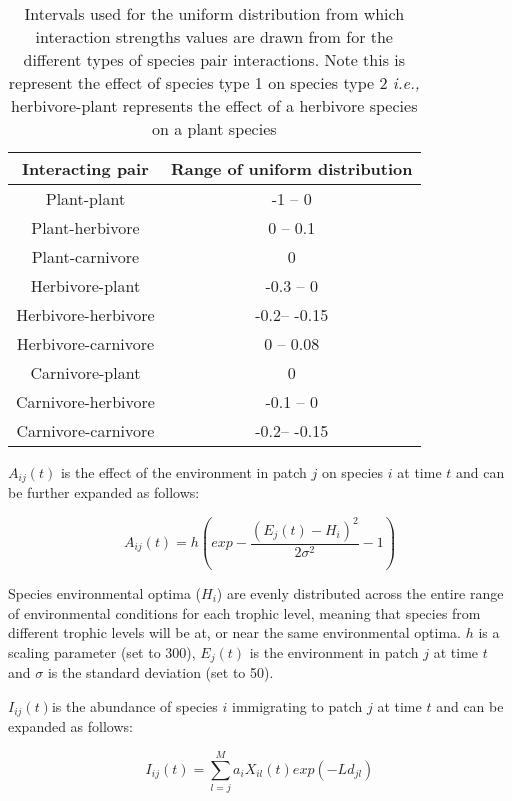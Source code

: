 \begin{table}[h!]
\centering
\begin{tabular}{||c c||} 
 \hline
Interacting pair & Range of uniform distribution \\ [0.5ex] \hline\hline
 Plant-plant & -1 -- 0 \\ 
 Plant-herbivore & 0 -- 0.1 \\
 Plant-carnivore & 0 \\
 Herbivore-plant & -0.3 -- 0 \\
 Herbivore-herbivore & -0.2-- -0.15 \\
 Herbivore-carnivore & 0 -- 0.08 \\
 Carnivore-plant & 0  \\
 Carnivore-herbivore & -0.1 -- 0  \\
 Carnivore-carnivore & -0.2-- -0.15 \\ [1ex] 
 \hline
\end{tabular}
\caption{Intervals used for the uniform distribution from which interaction
strengths values are drawn from for the different types of species pair
interactions. Note this is represent the effect of species type 1 on species
type 2 \emph{i.e.,} herbivore-plant represents the effect of a herbivore species
on a plant species}
\label{table:interaction_strength}
\end{table}

$A_{ij}(t)$ is the effect of the environment in patch $j$ on species $i$ at time $t$ and can be further expanded as follows:  

\begin{equation} \label{eq:metacomm_env}
A_{ij}(t)=h\left(exp-\frac{(E_{j}(t)-H_{i})^2}{2\sigma^2}-1\right)
\end{equation}

Species environmental optima ($H_i$) are evenly distributed across the entire
range of environmental conditions for each trophic level, meaning that species
from different trophic levels will be at, or near the same environmental optima. 
$h$ is a scaling parameter (set to 300), $E_j(t)$ is the environment in patch
$j$ at time $t$ and $\sigma$ is the standard deviation (set to 50).

$I_{ij}(t) $is the abundance of species $i$ immigrating to patch $j$ at time $t$
and can be expanded as follows:

\begin{equation} \label{eq:metacomm_imm}
I_{ij}(t)=\sum_{l=j}^{M}a_iX_{il}(t)exp(-Ld_{jl})
\end{equation}

